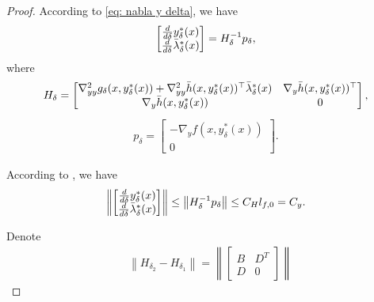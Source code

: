 \documentclass{article}
\newcommand{\nth}[1]{\left\| #1 \right\|}
\theoremstyle{plain}
\theoremstyle{definition}
\theoremstyle{remark}
\begin{document}
\begin{proof}
According to \eqref{eq: nabla y delta}, we have
    \begin{align*}
        \begin{bmatrix}
        \frac{d}{d \delta} y^*_\delta(x) \\
        \frac{d}{d \delta} \Bar{\lambda}^*_\delta(x)
        \end{bmatrix}=H_\delta^{-1}p_\delta,
    \end{align*}
where 
\begin{align*}
    H_\delta=\begin{bmatrix}
\nabla^2_{yy} g_\delta(x, y^*_\delta(x))+\nabla^2_{yy}\Bar{h}(x,y^*_\delta(x))^\top\Bar{\lambda}^*_\delta(x) & \nabla_y\Bar{h}(x,y^*_\delta(x))^\top \\
\nabla_y\Bar{h}(x,y^*_\delta(x)) & 0
\end{bmatrix},
\end{align*}
\begin{align*}
    p_\delta=\begin{bmatrix}
-\nabla_y f(x, y^*_\delta(x))\\
0
\end{bmatrix}.
\end{align*}

According to , we have
\begin{align*}
    \nth{\begin{bmatrix}
        \frac{d}{d \delta} y^*_\delta(x) \\
        \frac{d}{d \delta} \Bar{\lambda}^*_\delta(x)
    \end{bmatrix}}\leq\nth{H_\delta^{-1}p_\delta}\leq C_Hl_{f,0}=C_y.
\end{align*}


Denote
\begin{align*}
    &\nth{H_{\delta_2}-H_{\delta_1}}=\nth{\begin{bmatrix}
B & D^T \\
D & 0
\end{bmatrix}}
\end{align*}


\end{proof}
\end{document}
